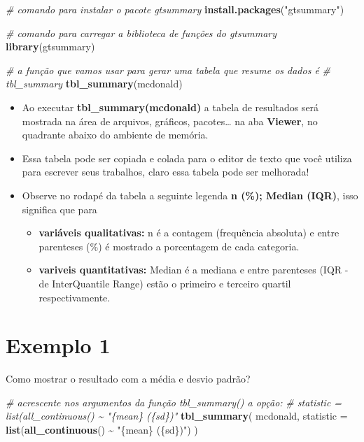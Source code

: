 \documentclass[
]{book}
\newenvironment{Shaded}{\begin{snugshade}}{\end{snugshade}}
\newcommand{\AttributeTok}[1]{\textcolor[rgb]{0.13,0.29,0.53}{#1}}
\newcommand{\CommentTok}[1]{\textcolor[rgb]{0.56,0.35,0.01}{\textit{#1}}}
\newcommand{\FunctionTok}[1]{\textcolor[rgb]{0.13,0.29,0.53}{\textbf{#1}}}
\newcommand{\NormalTok}[1]{#1}
\newcommand{\SpecialCharTok}[1]{\textcolor[rgb]{0.81,0.36,0.00}{\textbf{#1}}}
\newcommand{\StringTok}[1]{\textcolor[rgb]{0.31,0.60,0.02}{#1}}
\begin{document}
\begin{Shaded}
\begin{Highlighting}[]
\CommentTok{\# comando para instalar o pacote gtsummary}
\FunctionTok{install.packages}\NormalTok{(}\StringTok{"gtsummary"}\NormalTok{)}

\CommentTok{\# comando para carregar a biblioteca de funções do gtsummary}
\FunctionTok{library}\NormalTok{(gtsummary)}

\CommentTok{\# a função que vamos usar para gerar uma tabela que resume os dados é}
\CommentTok{\# tbl\_summary}
\FunctionTok{tbl\_summary}\NormalTok{(mcdonald)}
\end{Highlighting}
\end{Shaded}

\begin{itemize}
\item
  Ao executar \textbf{tbl\_summary(mcdonald)} a tabela de resultados será mostrada na área de arquivos, gráficos, pacotes\ldots{} na aba \textbf{Viewer}, no quadrante abaixo do ambiente de memória.
\item
  Essa tabela pode ser copiada e colada para o editor de texto que você utiliza para escrever seus trabalhos, claro essa tabela pode ser melhorada!
\item
  Observe no rodapé da tabela a seguinte legenda \textbf{n (\%); Median (IQR)}, isso significa que para

  \begin{itemize}
  \item
    \textbf{variáveis qualitativas:} n é a contagem (frequência absoluta) e entre parenteses (\%) é mostrado a porcentagem de cada categoria.
  \item
    \textbf{variveis quantitativas:} Median é a mediana e entre parenteses (IQR - de InterQuantile Range) estão o primeiro e terceiro quartil respectivamente.
  \end{itemize}
\end{itemize}

\section{Exemplo 1}\label{exemplo-1-2}

Como mostrar o resultado com a média e desvio padrão?

\begin{Shaded}
\begin{Highlighting}[]
\CommentTok{\# acrescente nos argumentos da função tbl\_summary() a opção:}
\CommentTok{\# statistic = list(all\_continuous() \textasciitilde{} "\{mean\} (\{sd\})"}
\FunctionTok{tbl\_summary}\NormalTok{(}
\NormalTok{            mcdonald, }
            \AttributeTok{statistic =} \FunctionTok{list}\NormalTok{(}\FunctionTok{all\_continuous}\NormalTok{() }\SpecialCharTok{\textasciitilde{}} \StringTok{"\{mean\} (\{sd\})"}\NormalTok{)}
\NormalTok{            )}
\end{Highlighting}
\end{Shaded}
\end{document}

